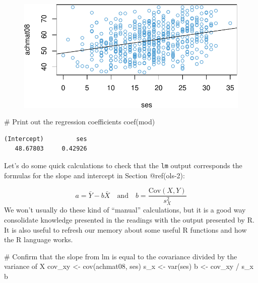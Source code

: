 \documentclass[
  letterpaper,
  DIV=11,
  numbers=noendperiod]{scrreprt}
\newenvironment{Shaded}{\begin{snugshade}}{\end{snugshade}}
\newcommand{\CommentTok}[1]{\textcolor[rgb]{0.37,0.37,0.37}{#1}}
\newcommand{\FunctionTok}[1]{\textcolor[rgb]{0.28,0.35,0.67}{#1}}
\newcommand{\NormalTok}[1]{\textcolor[rgb]{0.00,0.23,0.31}{#1}}
\newcommand{\OtherTok}[1]{\textcolor[rgb]{0.00,0.23,0.31}{#1}}
\newcommand{\SpecialCharTok}[1]{\textcolor[rgb]{0.37,0.37,0.37}{#1}}
\begin{document}
\begin{figure}[H]

{\centering \includegraphics{ch2_simple_regression_files/figure-pdf/unnamed-chunk-15-1.pdf}

}

\end{figure}

\begin{Shaded}
\begin{Highlighting}[]
\CommentTok{\# Print out the regression coefficients}
\FunctionTok{coef}\NormalTok{(mod)}
\end{Highlighting}
\end{Shaded}

\begin{verbatim}
(Intercept)         ses 
   48.67803     0.42926 
\end{verbatim}

Let's do some quick calculations to check that the \texttt{lm} output
corresponds the formulas for the slope and intercept in Section
@ref(ols-2):

\[ a = \bar Y - b \bar X \quad \text{and} \quad b = \frac{\text{Cov}(X, Y)}{s_X^2} \]
We won't usually do these kind of ``manual'' calculations, but it is a
good way consolidate knowledge presented in the readings with the output
presented by R. It is also useful to refresh our memory about some
useful R functions and how the R language works.

\begin{Shaded}
\begin{Highlighting}[]
\CommentTok{\# Confirm that the slope from lm is equal to the covariance divided by the variance of X}
\NormalTok{cov\_xy }\OtherTok{\textless{}{-}} \FunctionTok{cov}\NormalTok{(achmat08, ses)}
\NormalTok{s\_x }\OtherTok{\textless{}{-}} \FunctionTok{var}\NormalTok{(ses)}
\NormalTok{b }\OtherTok{\textless{}{-}}\NormalTok{ cov\_xy }\SpecialCharTok{/}\NormalTok{ s\_x}
\NormalTok{b}
\end{Highlighting}
\end{Shaded}
\end{document}
